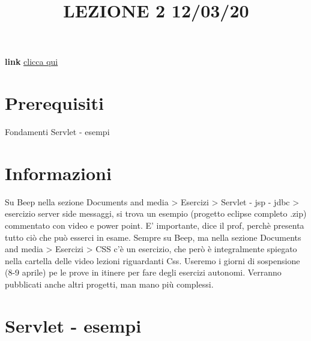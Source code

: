 \title{LEZIONE 2 12/03/20}\newline
\textbf{link} \href{https://web.microsoftstream.com/video/53d9a40e-3109-44fc-8195-0553eedfb6d9}{clicca qui}
\section*{Prerequisiti}
Fondamenti Servlet - esempi
\section*{Informazioni}
Su Beep nella sezione Documents and media > Esercizi > Servlet - jsp - jdbc > esercizio server side messaggi, si trova un esempio (progetto eclipse completo .zip) commentato con video e power point. E' importante, dice il prof, perchè presenta tutto ciò che può esserci in esame.\newline
Sempre su Beep, ma nella sezione Documents and media > Esercizi > CSS c'è un esercizio, che però è integralmente spiegato nella cartella delle video lezioni riguardanti Css.\newline
Useremo i giorni di sospensione (8-9 aprile) pe le prove in itinere per fare degli esercizi autonomi.\newline
Verranno pubblicati anche altri progetti, man mano più complessi.
\section{Servlet - esempi}
